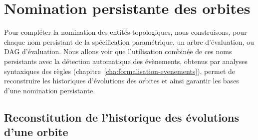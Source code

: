 \section{Nomination persistante des orbites}
\label{sec:reevaluation-nomination-persistante-orbites}


Pour compléter la nomination des entités topologiques, nous construisons, pour chaque nom persistant de la spécification paramétrique, un arbre d'évaluation, ou DAG d'évaluation. %
Nous allons voir que l'utilisation combinée de ces noms persistants avec la détection automatique des évènements, obtenus par analyses syntaxiques des règles (chapitre~\ref{cha:formalisation-evenements}), permet de reconstruire les historiques d'évolutions des orbites et ainsi garantir les bases d'une nomination persistante. %



\subsection{Reconstitution de l'historique des évolutions d'une orbite}
\label{sec:reevaluation-base-regles-nomination-persistante-orbites-reconstitution-historique}



